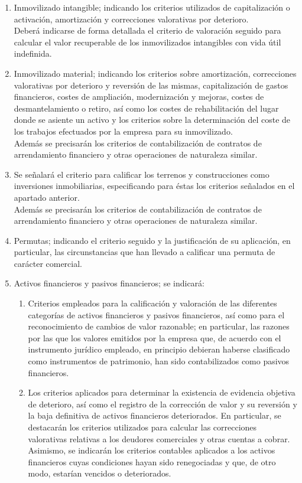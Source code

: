 \documentclass[11pt,a4paper]{article}
\begin{document}
\begin{enumerate}
 \item Inmovilizado intangible; indicando los criterios utilizados de capitalización o activación, amortización y correcciones valorativas por deterioro.\\
Deberá indicarse de forma detallada el criterio de valoración seguido para calcular el valor recuperable de los inmovilizados intangibles con vida útil indefinida.
\item Inmovilizado material; indicando los criterios sobre amortización, correcciones valorativas por deterioro y reversión de las mismas, capitalización de gastos financieros, costes de ampliación, modernización y mejoras, costes de desmantelamiento o retiro, así como los costes de rehabilitación del lugar donde se asiente un activo y los criterios sobre la determinación del coste de los trabajos efectuados por la empresa para su inmovilizado.\\
Además se precisarán los criterios de contabilización de contratos de arrendamiento financiero y otras operaciones de naturaleza similar.
\item Se señalará el criterio para calificar los terrenos y construcciones como inversiones inmobiliarias, especificando para éstas los criterios señalados en el apartado anterior.\\
Además se precisarán los criterios de contabilización de contratos de arrendamiento financiero y otras operaciones de naturaleza similar.
\item Permutas; indicando el criterio seguido y la justificación de su aplicación, en particular, las circunstancias que han llevado a calificar una permuta de carácter comercial.
\item Activos financieros y pasivos financieros; se indicará:
   \begin{enumerate}
    \item Criterios empleados para la calificación y valoración de las diferentes categorías de activos financieros y pasivos financieros, así como para el reconocimiento de cambios de valor razonable; en particular, las razones por las que los valores emitidos por la empresa que, de acuerdo con el instrumento jurídico empleado, en principio debieran haberse clasificado como instrumentos de patrimonio, han sido contabilizados como pasivos financieros.

    \item Los criterios aplicados para determinar la existencia de evidencia objetiva de deterioro, así como el registro de la corrección de valor y su reversión y la baja definitiva de activos financieros deteriorados. En particular, se destacarán los criterios utilizados para calcular las correcciones valorativas relativas a los deudores comerciales y otras cuentas a cobrar. Asimismo, se indicarán los criterios contables aplicados a los activos financieros cuyas condiciones hayan sido renegociadas y que, de otro modo, estarían vencidos o deteriorados.


\end{enumerate}
\end{enumerate}
\end{document}
